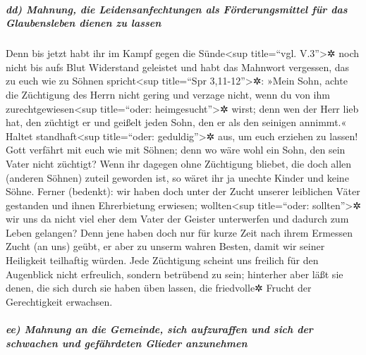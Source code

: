 \hypertarget{dd-mahnung-die-leidensanfechtungen-als-fuxf6rderungsmittel-fuxfcr-das-glaubensleben-dienen-zu-lassen}{%
\subparagraph{dd) Mahnung, die Leidensanfechtungen als Förderungsmittel
für das Glaubensleben dienen zu
lassen}\label{dd-mahnung-die-leidensanfechtungen-als-fuxf6rderungsmittel-fuxfcr-das-glaubensleben-dienen-zu-lassen}}

 Denn bis jetzt habt ihr im Kampf gegen die
Sünde\textless sup title=``vgl. V.3''\textgreater✲ noch nicht bis aufs
Blut Widerstand geleistet  und habt das Mahnwort
vergessen, das zu euch wie zu Söhnen spricht\textless sup title=``Spr
3,11-12''\textgreater✲: »Mein Sohn, achte die Züchtigung des Herrn nicht
gering und verzage nicht, wenn du von ihm zurechtgewiesen\textless sup
title=``oder: heimgesucht''\textgreater✲ wirst;  denn wen
der Herr lieb hat, den züchtigt er und geißelt jeden Sohn, den er als
den seinigen annimmt.«  Haltet standhaft\textless sup
title=``oder: geduldig''\textgreater✲ aus, um euch erziehen zu lassen!
Gott verfährt mit euch wie mit Söhnen; denn wo wäre wohl ein Sohn, den
sein Vater nicht züchtigt?  Wenn ihr dagegen ohne
Züchtigung bliebet, die doch allen (anderen Söhnen) zuteil geworden ist,
so wäret ihr ja unechte Kinder und keine Söhne.  Ferner
(bedenkt): wir haben doch unter der Zucht unserer leiblichen Väter
gestanden und ihnen Ehrerbietung erwiesen; wollten\textless sup
title=``oder: sollten''\textgreater✲ wir uns da nicht viel eher dem
Vater der Geister unterwerfen und dadurch zum Leben gelangen?
 Denn jene haben doch nur für kurze Zeit nach ihrem
Ermessen Zucht (an uns) geübt, er aber zu unserm wahren Besten, damit
wir seiner Heiligkeit teilhaftig würden.  Jede Züchtigung
scheint uns freilich für den Augenblick nicht erfreulich, sondern
betrübend zu sein; hinterher aber läßt sie denen, die sich durch sie
haben üben lassen, die friedvolle✲ Frucht der Gerechtigkeit erwachsen.

\hypertarget{ee-mahnung-an-die-gemeinde-sich-aufzuraffen-und-sich-der-schwachen-und-gefuxe4hrdeten-glieder-anzunehmen}{%
\subparagraph{ee) Mahnung an die Gemeinde, sich aufzuraffen und sich der
schwachen und gefährdeten Glieder
anzunehmen}\label{ee-mahnung-an-die-gemeinde-sich-aufzuraffen-und-sich-der-schwachen-und-gefuxe4hrdeten-glieder-anzunehmen}}

